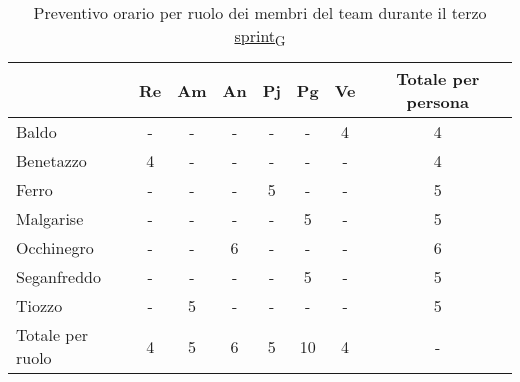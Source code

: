 \begin{table}[!h]
	\centering
	\begin{tabular}{ | l | c | c | c | c | c | c | c | }
		\hline
		\textbf{}        & \textbf{Re} & \textbf{Am} & \textbf{An} & \textbf{Pj} & \textbf{Pg} & \textbf{Ve} & \textbf{Totale per persona} \\
		\hline
		Baldo            & -           & -           & -           & -           & -           & 4           & 4                           \\
		Benetazzo        & 4           & -           & -           & -           & -           & -           & 4                           \\
		Ferro            & -           & -           & -           & 5           & -           & -           & 5                           \\
		Malgarise        & -           & -           & -           & -           & 5           & -           & 5                           \\
		Occhinegro       & -           & -           & 6           & -           & -           & -           & 6                           \\
		Seganfreddo      & -           & -           & -           & -           & 5           & -           & 5                           \\
		Tiozzo           & -           & 5           & -           & -           & -           & -           & 5                           \\
		\hline
		Totale per ruolo & 4           & 5           & 6           & 5           & 10          & 4           & -                           \\
		\hline
	\end{tabular}
	\caption{Preventivo orario per ruolo dei membri del team durante il terzo \href{https://7last.github.io/docs/rtb/documentazione-interna/glossario\#sprint}{sprint\textsubscript{G}}}
	
\end{table}

